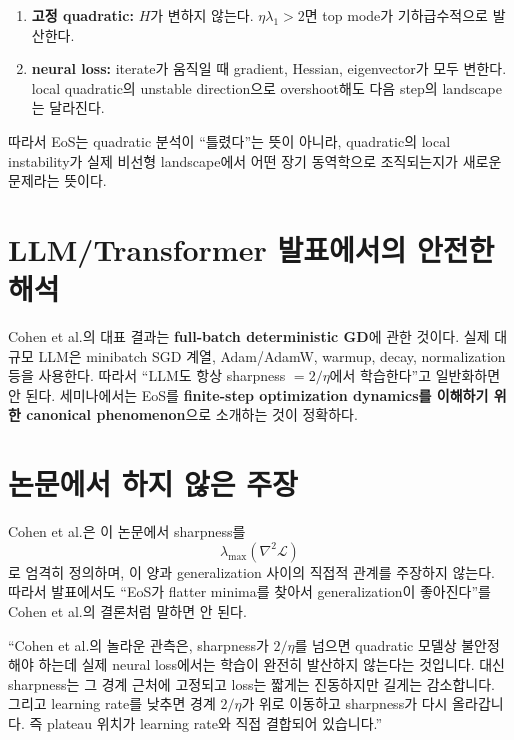 \documentclass[11pt,a4paper,oneside,openany]{memoir}
\newcommand{\Loss}{\mathcal{L}}
\newcommand{\Hess}{\nabla^2}
\theoremstyle{definition}
\begin{document}
\begin{enumerate}
  \item \textbf{고정 quadratic:} $H$가 변하지 않는다. $\eta\lambda_1>2$면 top mode가 기하급수적으로 발산한다.
  \item \textbf{neural loss:} iterate가 움직일 때 gradient, Hessian, eigenvector가 모두 변한다.
  local quadratic의 unstable direction으로 overshoot해도 다음 step의 landscape는 달라진다.
\end{enumerate}

따라서 EoS는 quadratic 분석이 ``틀렸다''는 뜻이 아니라,
quadratic의 local instability가 실제 비선형 landscape에서 어떤 장기 동역학으로 조직되는지가 새로운 문제라는 뜻이다.

\section{LLM/Transformer 발표에서의 안전한 해석}

\begin{warningbox}
Cohen et al.의 대표 결과는 \textbf{full-batch deterministic GD}에 관한 것이다.
실제 대규모 LLM은 minibatch SGD 계열, Adam/AdamW, warmup, decay, normalization 등을 사용한다.
따라서 ``LLM도 항상 sharpness $=2/\eta$에서 학습한다''고 일반화하면 안 된다.
세미나에서는 EoS를 \textbf{finite-step optimization dynamics를 이해하기 위한 canonical phenomenon}으로 소개하는 것이 정확하다.
\end{warningbox}

\section{논문에서 하지 않은 주장}

Cohen et al.은 이 논문에서 sharpness를
\begin{equation}
  \lambda_{\max}(\Hess\Loss)
\end{equation}
로 엄격히 정의하며, 이 양과 generalization 사이의 직접적 관계를 주장하지 않는다.
따라서 발표에서도 ``EoS가 flatter minima를 찾아서 generalization이 좋아진다''를 Cohen et al.의 결론처럼 말하면 안 된다.

\begin{presentbox}
``Cohen et al.의 놀라운 관측은, sharpness가 $2/\eta$를 넘으면 quadratic 모델상 불안정해야 하는데 실제 neural loss에서는
학습이 완전히 발산하지 않는다는 것입니다. 대신 sharpness는 그 경계 근처에 고정되고 loss는 짧게는 진동하지만 길게는 감소합니다.
그리고 learning rate를 낮추면 경계 $2/\eta$가 위로 이동하고 sharpness가 다시 올라갑니다. 즉 plateau 위치가 learning rate와 직접 결합되어 있습니다.''
\end{presentbox}
\end{document}

